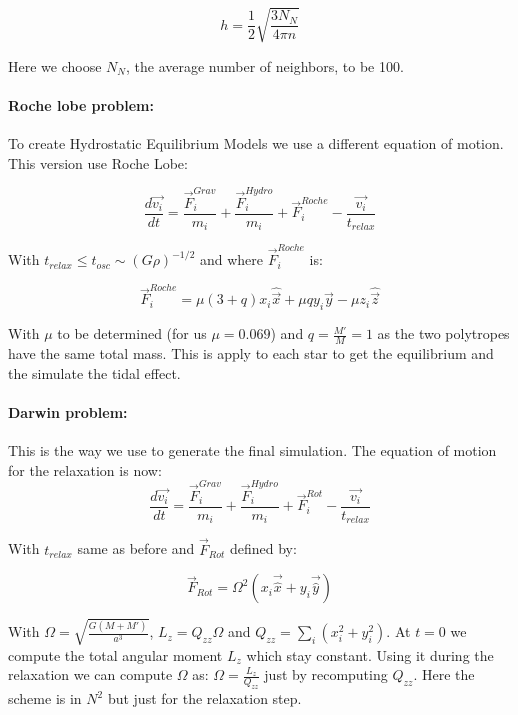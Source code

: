 $$ h = \frac{1}{2}\sqrt{\frac{3N_N}{4\pi n}} $$ 

Here we choose $N_N$, the average number of neighbors, to be 100.

\paragraph{Roche lobe problem: }
To create Hydrostatic Equilibrium Models we use a different equation of motion. This version use Roche Lobe:

\begin{equation}
\frac{d\vec{v_i}}{dt} = \frac{\vec{F}_i^{Grav}}{m_i} + \frac{\vec{F}_i^{Hydro}}{m_i} + \vec{F}_i^{Roche} - \frac{\vec{v_i}}{t_{relax}}
\end{equation}

 
With $t_{relax} \leq t_{osc} \sim (G\rho)^{-1/2}$ and 
where $\vec{F}_i^{Roche}$ is:

$$\vec{F}_i^{Roche} = \mu (3+q) x_i \hat{\vec{x}} + \mu q y_i \hat{\vec{y}}-\mu z_i \hat{\vec{z}}$$ 

With $\mu$ to be determined (for us $\mu = 0.069$) and $q = \frac{M'}{M}=1$ as the two polytropes have the same total mass.
This is apply to each star to get the equilibrium and the simulate the tidal effect. 

\paragraph{Darwin problem: }
This is the way we use to generate the final simulation. 
The equation of motion for the relaxation is now: 
\begin{equation}
\label{eq:darwin}
\frac{d\vec{v_i}}{dt} = \frac{\vec{F}_i^{Grav}}{m_i} +\frac{\vec{F}_i^{Hydro}}{m_i} + \vec{F}_i^{Rot} - \frac{\vec{v_i}}{t_{relax}}
\end{equation}

With $t_{relax}$ same as before and $\vec{F}_{Rot}$ defined by:

\begin{equation}
\vec{F}_{Rot} = \Omega^2(x_i \vec{\hat{x}}+y_i\vec{\hat{y}})
\end{equation}

With $\Omega = \sqrt{\frac{G(M+M')}{a^3}}$, $L_z = Q_{zz}\Omega$ and $Q_{zz} = \sum_i(x_i^2+y_i^2)$. At $t=0$ we compute the total angular moment $L_z$ which stay constant.
Using it during the relaxation we can compute $\Omega$ as: $\Omega = \frac{L_z}{Q_{zz}}$ just by recomputing $Q_{zz}$.
Here the scheme is in $N^2$ but just for the relaxation step. 

